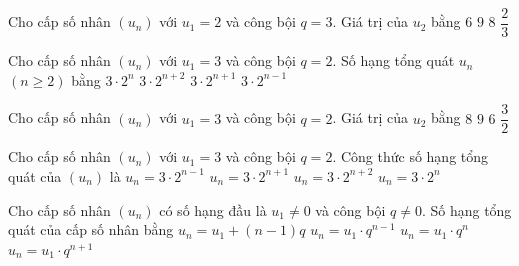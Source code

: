 

\begin{ex}%
	Cho cấp số nhân $(u_n)$ với $u_1=2$ và công bội $q=3$. Giá trị của $u_2$ bằng 
	\choice 
		{\True  $6$}
		 {$9$}
		 {$8$}
		 {$\dfrac{2}{3}$}
\end{ex}

\begin{ex}%
	Cho cấp số nhân $(u_n)$ với $u_1=3$ và công bội $q=2$. Số hạng tổng quát  $u_n$ $(n\ge 2)$ bằng
	\choice 
		 {$3\cdot 2^n$}
		{$3\cdot  2^{n+2}$}
		{$3\cdot  2^{n+1}$}
		 {\True $3\cdot 2^{n-1}$}
\end{ex}

\begin{ex}%
	Cho cấp số nhân $(u_n)$ với $u_1=3$  và công bội $q=2$. Giá trị của $u_2$ bằng
	 \choice
		{$8$} 
		 {$9$}
		 {\True $6$}
		{$\dfrac{3}{2}$} 
\end{ex}

\begin{ex}%
	Cho cấp  số nhân $(u_n)$ với $u_1=3$ và công bội $q=2$. Công thức số hạng tổng quát của $(u_n)$ là
	\choice 
		 {\True $u_n=3\cdot 2^{n-1}$}
		{$u_n=3\cdot  2^{n+1}$}
		{$u_n=3\cdot 2^{n+2}$} 
		{$u_n=3\cdot 2^n$} 
\end{ex}

\begin{ex}%
	Cho cấp số nhân $\left(u_n\right)$ có số hạng đầu là $u_1 \neq 0$ và công bội $q \neq 0$. Số hạng tổng quát của cấp số  nhân bằng
	 \choice
		 {$u_n = u_1 + \left(n-1\right)q$}
		{\True $u_n =  u_1 \cdot q^{n-1}$}
		 {$u_n = u_1 \cdot q^{n}$}
		{$u_n =  u_1 \cdot q^{n+1}$}
\end{ex}

